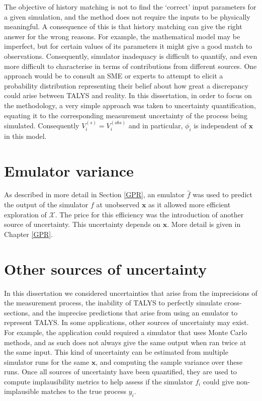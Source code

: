 \documentclass[
  12pt,
  a4paper,
  twoside]{book}
\begin{document}
The objective of history matching is not to find the `correct' input parameters for a given simulation, and the method does not require the inputs to be physically meaningful. A consequence of this is that history matching can give the right answer for the wrong reasons. For example, the mathematical model may be imperfect, but for certain values of its parameters it might give a good match to observations. Consequently, simulator inadequacy is difficult to quantify, and even more difficult to characterise in terms of contributions from different sources. One approach would be to consult an SME or experts to attempt to elicit a probability distribution representing their belief about how great a discrepancy could arise between TALYS and reality. In this dissertation, in order to focus on the methodology, a very simple approach was taken to uncertainty quantification, equating it to the corresponding measurement uncertainty of the process being simulated. Consequently \(V_i^{(s)}=V_i^{(obs)}\) and in particular, \(\phi_i\) is independent of \(\mathbf{x}\) in this model.

\hypertarget{em-var}{%
\section{Emulator variance}\label{em-var}}

As described in more detail in Section \ref{GPR}, an emulator \(\hat{f}\) was used to predict the output of the simulator \(f\) at unobserved \(\mathbf{x}\) as it allowed more efficient exploration of \(\mathcal{X}\). The price for this efficiency was the introduction of another source of uncertainty. This uncertainty depends on \(\mathbf{x}\). More detail is given in Chapter \ref{GPR}.

\hypertarget{other-sources}{%
\section{Other sources of uncertainty}\label{other-sources}}

In this dissertation we considered uncertainties that arise from the imprecisions of the measurement process, the inability of TALYS to perfectly simulate cross-sections, and the imprecise predictions that arise from using an emulator to represent TALYS. In some applications, other sources of uncertainty may exist. For example, the application could required a simulator that uses Monte Carlo methods, and as such does not always give the same output when ran twice at the same input. This kind of uncertainty can be estimated from multiple simulator runs for the same \(\mathbf{x}\), and computing the sample variance over these runs. Once all sources of uncertainty have been quantified, they are used to compute implausibility metrics to help assess if the simulator \(f_i\) could give non-implausible matches to the true process \(y_i\).
\end{document}
